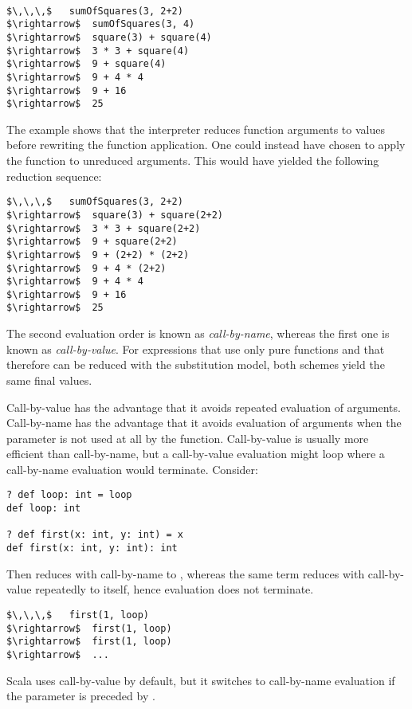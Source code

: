 \documentclass[a4paper,12pt,twoside,titlepage]{book}
\begin{document}
\example\ 
 
\begin{lstlisting}
$\,\,\,$   sumOfSquares(3, 2+2)
$\rightarrow$  sumOfSquares(3, 4)
$\rightarrow$  square(3) + square(4)
$\rightarrow$  3 * 3 + square(4)
$\rightarrow$  9 + square(4)
$\rightarrow$  9 + 4 * 4
$\rightarrow$  9 + 16
$\rightarrow$  25
\end{lstlisting}

The example shows that the interpreter reduces function arguments to
values before rewriting the function application.  One could instead
have chosen to apply the function to unreduced arguments. This would
have yielded the following reduction sequence:
\begin{lstlisting}
$\,\,\,$   sumOfSquares(3, 2+2)
$\rightarrow$  square(3) + square(2+2)
$\rightarrow$  3 * 3 + square(2+2)
$\rightarrow$  9 + square(2+2)
$\rightarrow$  9 + (2+2) * (2+2)
$\rightarrow$  9 + 4 * (2+2)
$\rightarrow$  9 + 4 * 4
$\rightarrow$  9 + 16
$\rightarrow$  25
\end{lstlisting}

The second evaluation order is known as \emph{call-by-name},
whereas the first one is known as \emph{call-by-value}.  For
expressions that use only pure functions and that therefore can be
reduced with the substitution model, both schemes yield the same final
values.  

Call-by-value has the advantage that it avoids repeated evaluation of
arguments. Call-by-name has the advantage that it avoids evaluation of
arguments when the parameter is not used at all by the function.
Call-by-value is usually more efficient than call-by-name, but a
call-by-value evaluation might loop where a call-by-name evaluation
would terminate. Consider:
\begin{lstlisting}
? def loop: int = loop
def loop: int

? def first(x: int, y: int) = x
def first(x: int, y: int): int
\end{lstlisting}
Then  reduces with call-by-name to ,
whereas the same term reduces with call-by-value repeatedly to itself,
hence evaluation does not terminate.
\begin{lstlisting}
$\,\,\,$   first(1, loop)
$\rightarrow$  first(1, loop)
$\rightarrow$  first(1, loop)
$\rightarrow$  ...
\end{lstlisting}
Scala uses call-by-value by default, but it switches to call-by-name evaluation
if the parameter is preceded by .
\end{document}
